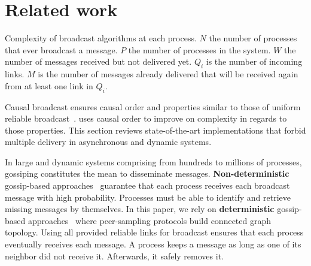 
\section{Related work}
\label{sec:relatedwork}

\begin{table*}
  \begin{center}
    \caption{\label{table:complexity} Complexity of broadcast algorithms at each
      process. $N$ the number of processes that ever broadcast a message. $P$
      the number of processes in the system. $W$ the number of messages received
      but not delivered yet. $Q_i$ is the number of incoming links. $M$ is the
      number of messages already delivered that will be received again from at
      least one link in $Q_i$.}
  
  \end{center}
\end{table*}

Causal broadcast ensures causal order and properties similar to those of uniform
reliable broadcast~\cite{hadzilacos1994modular}. \RPCBROADCAST uses causal order
to improve on complexity in regards to those properties. 
This section reviews state-of-the-art implementations that forbid multiple
delivery in asynchronous and dynamic systems. 

In large and dynamic systems comprising from hundreds to millions of processes,
gossiping constitutes the mean to disseminate
messages. \textbf{Non-deterministic} gossip-based
approaches~\cite{birman1999bimodal,demers1987epidemic} guarantee that each
process receives each broadcast message with high probability. Processes must be
able to identify and retrieve missing messages by themselves. In this paper, we
rely on \textbf{deterministic} gossip-based
approaches~\cite{friedman2004causal,nedelec2017adaptive} where peer-sampling
protocols build connected graph topology. Using all provided reliable links for
broadcast ensures that each process eventually receives each message. A process
keeps a message as long as one of its neighbor did not receive it. Afterwards,
it safely removes it.

